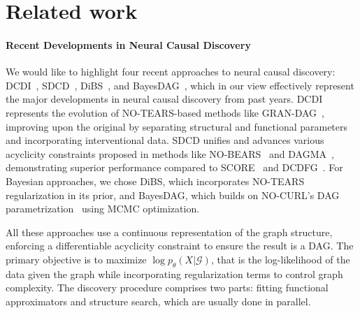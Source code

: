 \section{Related work}
\label{sec:related_work}


\paragraph{Recent Developments in Neural Causal Discovery}
\label{par:score_based}



We would like to highlight four recent approaches to neural causal discovery: DCDI~\citep{dcdi}, SDCD~\citep{sdcd}, DiBS~\citep{dibs}, and BayesDAG~\citep{bayesdag}, which in our view effectively represent the major developments in neural causal discovery from  past years. DCDI represents the evolution of NO-TEARS-based methods like GRAN-DAG~\citep{notears, grandag}, improving upon the original by separating structural and functional parameters and incorporating interventional data. SDCD unifies and advances various acyclicity constraints proposed in methods like NO-BEARS~\citep{nobears} and DAGMA~\citep{dagma}, demonstrating superior performance compared to SCORE~\citep{score} and DCDFG~\citep{dcdfg}. For Bayesian approaches, we chose DiBS, which incorporates NO-TEARS regularization in its prior, and BayesDAG, which builds on NO-CURL's DAG parametrization~\citep{nocurl} using MCMC optimization. 

All these approaches use a continuous representation of the graph structure, enforcing a differentiable acyclicity constraint to ensure the result is a DAG. The primary objective is to maximize $\log p_\theta(X|\mathcal{G})$, that is the log-likelihood of the data given the graph while incorporating regularization terms to control graph complexity.
The discovery procedure comprises two parts: fitting functional approximators and structure search, which are usually done in parallel.


